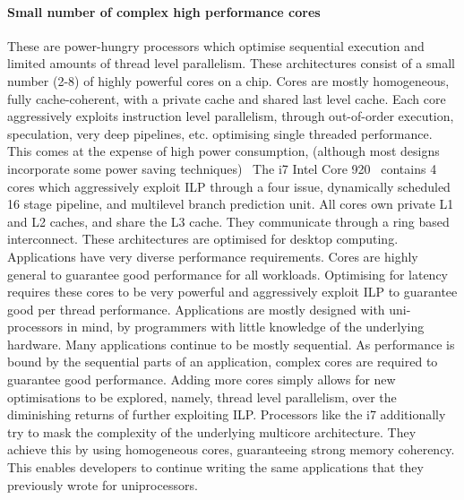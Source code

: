 \paragraph{Small number of complex high performance cores}
These are power-hungry processors which optimise sequential execution
and limited amounts of thread level parallelism. These architectures 
consist of a small number (2-8) of highly powerful cores on a 
chip. Cores are mostly homogeneous, fully cache-coherent, with a private cache 
and shared last level cache. 
Each core aggressively exploits instruction level parallelism, through
out-of-order execution, speculation, very deep pipelines, etc. optimising
single threaded performance. This comes at the expense of high power consumption, 
(although most designs incorporate some power
saving techniques)~\cite{Vajda:1414193,Borkar:2007:TCC:1278480.1278667}
The i7 Intel Core 920~\cite{rotem2012pai} contains 4 cores which aggressively exploit ILP through a four issue, dynamically scheduled 16 stage pipeline, and multilevel branch prediction unit. All cores own
 private L1 and L2 caches, and share the L3 cache. They communicate
through a ring based interconnect. These architectures are
optimised for desktop computing. Applications have very diverse performance requirements. Cores are highly general to guarantee good performance for all workloads. Optimising for latency requires these cores to be very powerful  and aggressively exploit ILP to guarantee good per thread performance. Applications are mostly designed with uni-processors in mind, by programmers with little knowledge of the underlying hardware. Many applications continue to be mostly sequential. As performance is bound by the sequential parts of an application, 
complex cores are required to guarantee good performance.
Adding more cores simply allows for new optimisations to be explored, namely, 
thread level parallelism, over the diminishing returns of further exploiting ILP.
Processors like the i7 additionally try to mask the complexity of the underlying 
multicore architecture. They achieve this by using homogeneous cores, guaranteeing
strong memory coherency. This enables developers to continue writing
the same applications that they previously wrote for uniprocessors.


